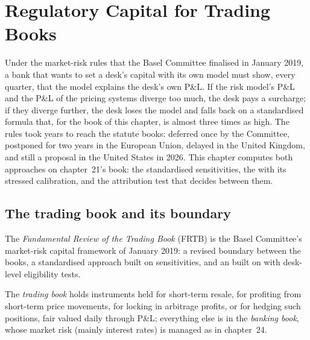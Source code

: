 \chapter{Regulatory Capital for Trading Books}\label{ch:rc:regulatory-capital-for-trading-books}

Under the market-risk rules that the Basel Committee finalised in January 2019, a bank that
wants to set a desk's capital with its own model must show, every quarter, that the model
explains the desk's own P\&L. If the risk model's P\&L and the P\&L of the pricing systems
diverge too much, the desk pays a surcharge; if they diverge further, the desk loses the
model and falls back on a standardised formula that, for the book of this chapter, is almost
three times as high. The rules took years to reach the statute books: deferred once by the
Committee, postponed for two years in the European Union, delayed in the United Kingdom, and still a
proposal in the United States in 2026. This chapter computes both approaches on chapter~21's
book: the standardised sensitivities, the  with its stressed calibration,
and the attribution test that decides between them.

\section{The trading book and its boundary}

\begin{definition}\label{def:rc:regulatory-capital-for-trading-books:frtb}
The \emph{Fundamental Review of the Trading Book}
(FRTB) is the Basel Committee's market-risk capital framework of January 2019: a revised
boundary between the books, a standardised approach built on sensitivities, and an  built on  with desk-level eligibility tests.
\end{definition}

\begin{definition}\label{def:rc:regulatory-capital-for-trading-books:books}
The \emph{trading book} holds instruments held for short-term resale, for
profiting from short-term price movements, for locking in arbitrage profits, or for hedging
such positions, fair valued daily through P\&L; everything else is in the \emph{banking
book}, whose market risk (mainly interest rates) is managed as in
chapter~24.
\end{definition}

